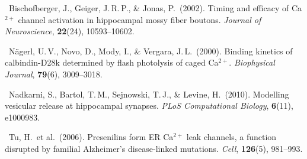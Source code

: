 \documentclass[11pt]{article}
\begin{document}
\smallskip
\noindent[5]\ Bischofberger, J., Geiger, J.\,R.\,P., \& Jonas, P.\ (2002).
Timing and efficacy of Ca$^{2+}$ channel activation in hippocampal
mossy fiber boutons.
\textit{Journal of Neuroscience}, \textbf{22}(24), 10593--10602.

\smallskip
\noindent[6]\ N\"{a}gerl, U.\,V., Novo, D., Mody, I., \& Vergara, J.\,L.\ (2000).
Binding kinetics of calbindin-D28k determined by flash photolysis of
caged Ca$^{2+}$.
\textit{Biophysical Journal}, \textbf{79}(6), 3009--3018.

\smallskip
\noindent[7]\ Nadkarni, S., Bartol, T.\,M., Sejnowski, T.\,J., \& Levine, H.\ (2010).
Modelling vesicular release at hippocampal synapses.
\textit{PLoS Computational Biology}, \textbf{6}(11), e1000983.

\smallskip
\noindent[8]\ Tu, H.\ et al.\ (2006).
Presenilins form ER Ca$^{2+}$ leak channels, a function disrupted by
familial Alzheimer's disease-linked mutations.
\textit{Cell}, \textbf{126}(5), 981--993.
\end{document}
